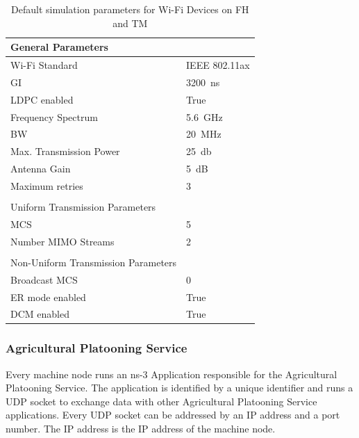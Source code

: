 \begin{table}[H]
	\centering
	\begin{tabular}{p{6cm}p{4cm}}
		General Parameters & \\
		\midrule
		Wi-Fi Standard & IEEE 802.11ax\\
		\ac{GI} & \SI{3200}{\nano\second}\\
		\ac{LDPC} enabled & True\\
		Frequency Spectrum & \SI{5.6}{\giga\hertz}\\
		\ac{BW} & \SI{20}{\mega\hertz}\\
		Max. Transmission Power & \SI{25}{\decibel}\\
		Antenna Gain & \SI{5}{\dB}\\
		Maximum retries & \num{3}\\
		 & \\
		Uniform Transmission Parameters & \\
		\midrule
		\ac{MCS} & \num{5}\\
		Number \ac{MIMO} Streams & \num{2}\\
		 & \\
		Non-Uniform Transmission Parameters & \\
		\midrule
		Broadcast \ac{MCS} & \num{0}\\
		\ac{ER} mode enabled & True\\
		\ac{DCM} enabled & True\\
	\end{tabular}
	\caption{Default simulation parameters for Wi-Fi Devices on \acf{FH} and \acf{TM}}
	\label{tab:SimulationParametersWiFi}
\end{table}

\subsubsection*{Agricultural Platooning Service}
Every machine node runs an ns-3 Application responsible for the Agricultural Platooning Service.
The application is identified by a unique identifier and runs a UDP socket to exchange data with other Agricultural Platooning Service applications.
Every UDP socket can be addressed by an IP address and a port number.
The IP address is the IP address of the machine node.

